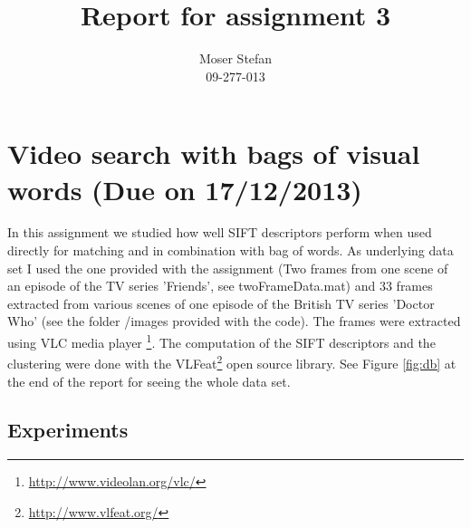 \documentclass{paper}
\title{Report for assignment 3}
\author{Moser Stefan\\09-277-013}
\begin{document}
\maketitle

\section{Video search with bags of visual words (Due on 17/12/2013)}
In this assignment we studied how well SIFT descriptors perform when used directly 
for matching and in combination with bag of words. As underlying data set I used the
one provided with the assignment (Two frames from one scene of an episode of the TV series 'Friends',
see twoFrameData.mat) and 33 frames extracted from various scenes of one episode of the
British TV series 'Doctor Who' (see the folder /images provided with the code). The
frames were extracted using VLC media player \footnote{\url{http://www.videolan.org/vlc/}}.
The computation of the SIFT descriptors and the clustering were done with the VLFeat\footnote{\url{http://www.vlfeat.org/}} open source library.
See Figure \ref{fig:db} at the end of the report for seeing the whole data set.

\subsection{Experiments}
\end{document}
